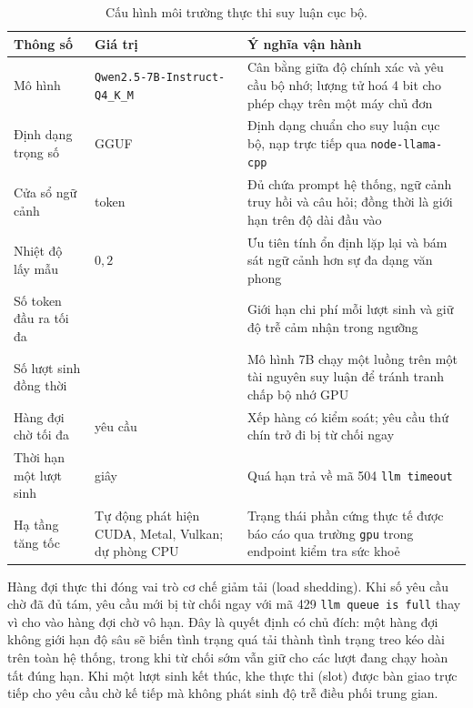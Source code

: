 \begin{table}[htbp]
    \centering
    \caption{Cấu hình môi trường thực thi suy luận cục bộ.}
    \label{tab:cau-hinh-inference-runtime}
    \small
    \begin{tabularx}{\textwidth}{@{}>{\raggedright\arraybackslash}p{3.6cm}>{\raggedright\arraybackslash}p{4.3cm}>{\raggedright\arraybackslash}X@{}}
        \toprule
        \textbf{Thông số} & \textbf{Giá trị} & \textbf{Ý nghĩa vận hành} \\
        \midrule
        Mô hình & \texttt{Qwen2.5-7B-\allowbreak Instruct-Q4\_K\_M} & Cân bằng giữa độ chính xác và yêu cầu bộ nhớ; lượng tử hoá 4 bit cho phép chạy trên một máy chủ đơn \\
        Định dạng trọng số & GGUF & Định dạng chuẩn cho suy luận cục bộ, nạp trực tiếp qua \texttt{node-llama-cpp} \\
        Cửa sổ ngữ cảnh & 8.192 token & Đủ chứa prompt hệ thống, ngữ cảnh truy hồi và câu hỏi; đồng thời là giới hạn trên độ dài đầu vào \\
        Nhiệt độ lấy mẫu & $0{,}2$ & Ưu tiên tính ổn định lặp lại và bám sát ngữ cảnh hơn sự đa dạng văn phong \\
        Số token đầu ra tối đa & 1.024 & Giới hạn chi phí mỗi lượt sinh và giữ độ trễ cảm nhận trong ngưỡng \\
        Số lượt sinh đồng thời & 1 & Mô hình 7B chạy một luồng trên một tài nguyên suy luận để tránh tranh chấp bộ nhớ GPU \\
        Hàng đợi chờ tối đa & 8 yêu cầu & Xếp hàng có kiểm soát; yêu cầu thứ chín trở đi bị từ chối ngay \\
        Thời hạn một lượt sinh & 60 giây & Quá hạn trả về mã 504 \texttt{llm timeout} \\
        Hạ tầng tăng tốc & Tự động phát hiện CUDA, Metal, Vulkan; dự phòng CPU & Trạng thái phần cứng thực tế được báo cáo qua trường \texttt{gpu} trong endpoint kiểm tra sức khoẻ \\
        \bottomrule
    \end{tabularx}
\end{table}

Hàng đợi thực thi đóng vai trò cơ chế giảm tải (load shedding). Khi số yêu cầu chờ đã đủ tám, yêu cầu mới bị từ chối ngay với mã 429 \texttt{llm queue is full} thay vì cho vào hàng đợi chờ vô hạn. Đây là quyết định có chủ đích: một hàng đợi không giới hạn độ sâu sẽ biến tình trạng quá tải thành tình trạng treo kéo dài trên toàn hệ thống, trong khi từ chối sớm vẫn giữ cho các lượt đang chạy hoàn tất đúng hạn. Khi một lượt sinh kết thúc, khe thực thi (slot) được bàn giao trực tiếp cho yêu cầu chờ kế tiếp mà không phát sinh độ trễ điều phối trung gian.

